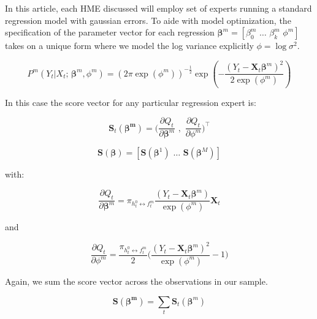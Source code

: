 \documentclass[12pt]{article}
\newcommand{\gateprod}[2]{\pi_{#1 \longleftrightarrow #2}}
\begin{document}
In this article, each HME discussed will employ set of experts running 
a standard regression model with gaussian errors. To aide with model optimization,
the specification of the parameter vector for each regression
 $\boldsymbol{\beta}^{m} = [\beta_{0}^{m} \,\, \ldots \,\, \beta_{k}^m \,\, \phi^{m}]$
takes on a unique form where we model the log variance explicitly
$\phi = \log \sigma^{2}$.

\begin{equation}
  P^{m}(Y_{t} | X_{t}; \, \boldsymbol{\beta}^{m}, \phi^{m}) = \left( 2 \pi \exp ( \phi^{m} ) \right)^{-\frac{1}{2}} \exp{ \left( -\frac{  ( Y_{t} - \boldsymbol{X}_{t} \boldsymbol{\beta}^{m} )^{2}  }{2 \exp (\phi^{m}) } \right) }
\end{equation}


In this case the score vector for any particular
regression expert is:

\begin{equation} \label{eq:expertScore}
  \boldsymbol{S}_{t}(\boldsymbol{\beta^{m}}) = \Big( \frac{\partial Q_{t}}{\partial \boldsymbol{\beta}^{m}} \,\,,\,\, \frac{\partial Q_{t}}{\partial \phi^{m}} \Big)^{\top}
\end{equation}

\begin{equation}
  \boldsymbol{S}(\boldsymbol{\beta}) = [ \boldsymbol{S}(\boldsymbol{\beta}^{1}) \,\, \ldots \,\, \boldsymbol{S}(\boldsymbol{\beta}^{M}) ]
\end{equation}



with:

\begin{equation}
  \frac{\partial Q_{t}}{\partial \boldsymbol{\beta}^{m}} = \gateprod{h^{0}_{t}}{f^{m}_{t}} \frac{( Y_{t} - \boldsymbol{X}_{t} \boldsymbol{\beta}^{m} )}{\exp{(\phi^{m})}} \boldsymbol{X}_{t}
\end{equation}
 
and

\begin{equation}
  \frac{\partial Q_{t}}{\partial \phi^{m}} = \frac{\gateprod{h^{0}_{t}}{f^{m}_{t}}}{2} \Big( \frac{( Y_{t} - \boldsymbol{X}_{t} \boldsymbol{\beta}^{m} )^{2}}{\exp{(\phi^{m})}} - 1 \Big)
\end{equation}

Again, we sum the score vector across the observations in our sample. 

\begin{equation}
  \boldsymbol{S}(\boldsymbol{\beta^{m}}) = \sum_{t} \boldsymbol{S}_{t}(\boldsymbol{\beta}^{m})
\end{equation}
\end{document}
